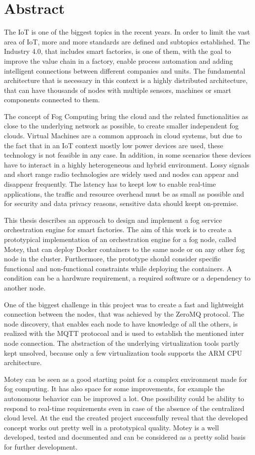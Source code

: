 \chapter*{Abstract}\label{chapter:abstract}
The \ac{IoT} is one of the biggest topics in the recent years.
In order to limit the vast area of \ac{IoT}, more and more standards are defined and subtopics established.
The Industry 4.0, that includes smart factories, is one of them, with the goal to improve the value chain in a factory, enable process automation and adding intelligent connections between different companies and units.
The fundamental architecture that is necessary in this context is a highly distributed architecture, that can have thousands of nodes with multiple sensors, machines or smart components connected to them.

The concept of Fog Computing bring the cloud and the related functionalities as close to the underlying network as possible, to create smaller independent fog clouds.
Virtual Machines are a common approach in cloud systems, but due to the fact that in an \ac{IoT} context mostly low power devices are used, these technology is not feasible in any case.
In addition, in some scenarios these devices have to interact in a highly heterogeneous and hybrid environment.
Lossy signals and short range radio technologies are widely used and nodes can appear and disappear frequently.
The latency has to keept low to enable real-time applications, the traffic and resource overhead must be as small as possible and for security and data privacy reasons, sensitive data should keept on-premise.

This thesis describes an approach to design and implement a fog service orchestration engine for smart factories.
The aim of this work is to create a prototypical implementation of an orchestration engine for a fog node, called Motey, that can deploy Docker containers to the same node or on any other fog node in the cluster.
Furthermore, the prototype should consider specific functional and non-functional constraints while deploying the containers.
A condition can be a hardware requirement, a required software or a dependency to another node.

One of the biggest challenge in this project was to create a fast and lightweight connection between the nodes, that was achieved by the ZeroMQ protocol.
The node discovery, that enables each node to have knowledge of all the others, is realized with the \acs{MQTT} protocoal and is used to establish the mentioned inter node connection.
The abstraction of the underlying virtualization tools partly kept unsolved, because only a few virtualization tools supports the ARM \acs{CPU} architecture.

Motey can be seen as a good starting point for a complex environment made for fog computing.
It has also space for some improvements, for example the autonomous behavior can be improved a lot.
One possibility could be ability to respond to real-time requirements even in case of the absence of the centralized cloud level.
At the end the created project successfully reveal that the developed concept works out pretty well in a prototypical quality.
Motey is a well developed, tested and documented and can be considered as a pretty solid basis for further development.
